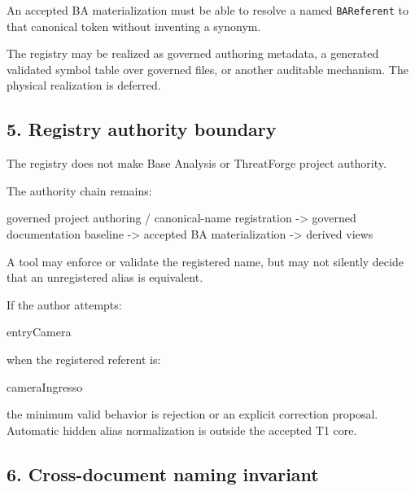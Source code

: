 \documentclass[
  10pt,
  a4paper,
]{article}
\newenvironment{Shaded}{}{}
\newcommand{\NormalTok}[1]{#1}
\begin{document}
An accepted BA materialization must be able to resolve a named
\texttt{BAReferent} to that canonical token without inventing a synonym.

The registry may be realized as governed authoring metadata, a generated
validated symbol table over governed files, or another auditable
mechanism. The physical realization is deferred.

\subsection{5. Registry authority
boundary}\label{registry-authority-boundary}

The registry does not make Base Analysis or ThreatForge project
authority.

The authority chain remains:

\begin{Shaded}
\begin{Highlighting}[]
\NormalTok{governed project authoring / canonical{-}name registration}
\NormalTok{    {-}\textgreater{} governed documentation baseline}
\NormalTok{        {-}\textgreater{} accepted BA materialization}
\NormalTok{            {-}\textgreater{} derived views}
\end{Highlighting}
\end{Shaded}

A tool may enforce or validate the registered name, but may not silently
decide that an unregistered alias is equivalent.

If the author attempts:

\begin{Shaded}
\begin{Highlighting}[]
\NormalTok{entryCamera}
\end{Highlighting}
\end{Shaded}

when the registered referent is:

\begin{Shaded}
\begin{Highlighting}[]
\NormalTok{cameraIngresso}
\end{Highlighting}
\end{Shaded}

the minimum valid behavior is rejection or an explicit correction
proposal. Automatic hidden alias normalization is outside the accepted
T1 core.

\subsection{6. Cross-document naming
invariant}\label{cross-document-naming-invariant}
\end{document}
